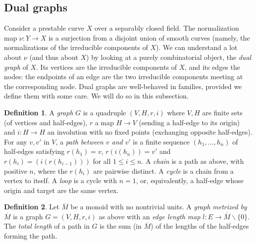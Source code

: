 \documentclass[a4paper,12pt]{amsart} %
\numberwithin{equation}{subsection}
\def\o#1{\overline{#1}}
\theoremstyle{definition}
\newtheorem{definition}{Definition}[section]
\theoremstyle{plain}%
\theoremstyle{remark}
\begin{document}
\subsection{Dual graphs}

Consider a prestable curve $X$ over a separably closed field. The normalization map $\nu\colon Y \to X$ is a surjection from a disjoint union of smooth curves (namely, the normalizations of the irreducible components of $X$). We can understand a lot about $\nu$ (and thus about $X$) by looking at a purely combinatorial object, the \emph{dual graph} of $X$. Its vertices are the irreducible components of $X$, and its edges the nodes: the endpoints of an edge are the two irreducible components meeting at the corresponding node. Dual graphs are well-behaved in families, provided we define them with some care. We will do so in this subsection.

\begin{definition}
A \emph{graph} $G$ is a quadruple $(V,H,r,i)$ where $V,H$ are finite sets (of vertices and half-edges), $r$ a map $H \to V$ (sending a half-edge to its origin) and $i\colon H \to H$ an involution with no fixed points (exchanging opposite half-edges). For any $v,v'$ in $V$, a \emph{path between $v$ and $v'$} is a finite sequence $(h_1,...,h_n)$ of half-edges satisfying $r(h_1)=v$, $r(i(h_n))=v'$ and $r(h_i)=(i(r(h_{i-1})))$ for all $1\leq i\leq n$. A \emph{chain} is a path as above, with positive $n$, where the $r(h_i)$ are pairwise distinct. A \emph{cycle} is a chain from a vertex to itself. A \emph{loop} is a cycle with $n=1$, or, equivalently, a half-edge whose origin and target are the same vertex.
\end{definition}



\begin{definition}
	Let $\o M$ be a monoid with no nontrivial units. A \emph{graph metrized by $\o M$} is a graph $G=(V,H,r,i)$ as above with an \emph{edge length map} $l \colon E \to \o M\backslash\{0\}$. The \emph{total length} of a path in $G$ is the sum (in $\o M$) of the lengths of the half-edges forming the path.
\end{definition}
\end{document}
